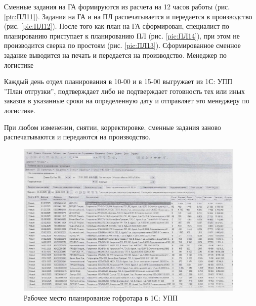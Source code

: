 Сменные задания на ГА формируются из расчета на 12 часов работы (рис. \ref{pic:ПЛ11}). 
Задания на ГА и на ПЛ распечатывается и передается в производство (рис. \ref{pic:ПЛ12}). После того как план на ГА сформирован, специалист по планированию приступает к планированию ПЛ (рис. \ref{pic:ПЛ14}), при этом не производится сверка по простоям (рис. \ref{pic:ПЛ13}). Сформированное сменное задание выводится на печать и передается на производство.
Менеджер по логистике

Каждый день отдел планирования в 10-00 и в 15-00 выгружает из 1С: УПП ''План отгрузки'', подтверждает  либо не подтверждает готовность тех или иных заказов в указанные сроки на определенную дату и отправляет это менеджеру по логистике.

При любом изменении, снятии, корректировке, сменные задания заново распечатываются и передаются на производство.


\clearpage




\begin{figure}
\begin{center}
 \includegraphics[height=0.4\textheight, keepaspectratio]{Pics/VII 12.jpg}
\end{center}
 \caption{Рабочее место планирование гофротара в 1С: УПП}
 \label{pic:VII 12}
\end{figure}



